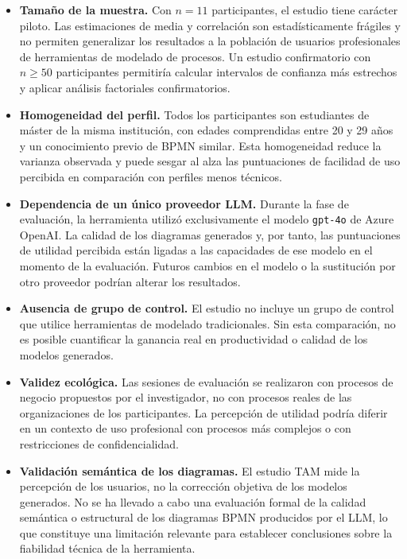 \begin{itemize}
  \item \textbf{Tamaño de la muestra.} Con $n = 11$ participantes, el estudio tiene carácter piloto. Las estimaciones de media y correlación son estadísticamente frágiles y no permiten generalizar los resultados a la población de usuarios profesionales de herramientas de modelado de procesos. Un estudio confirmatorio con $n \geq 50$ participantes permitiría calcular intervalos de confianza más estrechos y aplicar análisis factoriales confirmatorios.

  \item \textbf{Homogeneidad del perfil.} Todos los participantes son estudiantes de máster de la misma institución, con edades comprendidas entre 20 y 29 años y un conocimiento previo de BPMN similar. Esta homogeneidad reduce la varianza observada y puede sesgar al alza las puntuaciones de facilidad de uso percibida en comparación con perfiles menos técnicos.

  \item \textbf{Dependencia de un único proveedor LLM.} Durante la fase de evaluación, la herramienta utilizó exclusivamente el modelo \texttt{gpt-4o} de Azure OpenAI. La calidad de los diagramas generados y, por tanto, las puntuaciones de utilidad percibida están ligadas a las capacidades de ese modelo en el momento de la evaluación. Futuros cambios en el modelo o la sustitución por otro proveedor podrían alterar los resultados.

  \item \textbf{Ausencia de grupo de control.} El estudio no incluye un grupo de control que utilice herramientas de modelado tradicionales. Sin esta comparación, no es posible cuantificar la ganancia real en productividad o calidad de los modelos generados.

  \item \textbf{Validez ecológica.} Las sesiones de evaluación se realizaron con procesos de negocio propuestos por el investigador, no con procesos reales de las organizaciones de los participantes. La percepción de utilidad podría diferir en un contexto de uso profesional con procesos más complejos o con restricciones de confidencialidad.

  \item \textbf{Validación semántica de los diagramas.} El estudio TAM mide la percepción de los usuarios, no la corrección objetiva de los modelos generados. No se ha llevado a cabo una evaluación formal de la calidad semántica o estructural de los diagramas BPMN producidos por el LLM, lo que constituye una limitación relevante para establecer conclusiones sobre la fiabilidad técnica de la herramienta.
\end{itemize}

